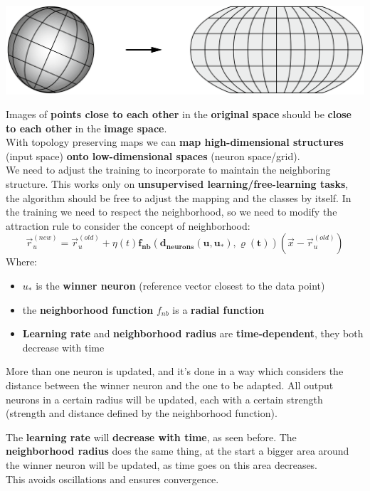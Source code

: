 \begin{center}
	\includegraphics[width=0.9\columnwidth]{img/NN/topology1}
\end{center}

Images of \textbf{points close to each other} in the \textbf{original space} should be \textbf{close to each other} in the \textbf{image space}.\\

With topology preserving maps we can \textbf{map high-dimensional structures} (input space) \textbf{onto low-dimensional spaces} (neuron space/grid).\\

We need to adjust the training to incorporate to maintain the neighboring structure. This works only on \textbf{unsupervised learning/free-learning tasks}, the algorithm should be free to adjust the mapping and the classes by itself. In the training we need to respect the neighborhood, so we need to modify the attraction rule to consider the concept of neighborhood:
$$ \vec{r}_u^{(new)} = \vec{r}_u^{(old)} + \eta(t) \bm{f_{nb} \left(d_{neurons} (u, u_{\ast}), \varrho (t)\right)} (\vec{x} - \vec{r}_u^{(old)}) $$
Where: 
\begin{itemize}
	\item $u_\ast$ is the \textbf{winner neuron} (reference vector closest to the data point)
	\item the \textbf{neighborhood function} $f_{nb}$ is a \textbf{radial function}
	\item \textbf{Learning rate} and \textbf{neighborhood radius} are \textbf{time-dependent}, they both decrease with time
\end{itemize}
More than one neuron is updated, and it's done in a way which considers the distance between the winner neuron and the one to be adapted. All output neurons in a certain radius will be updated, each with a certain strength (strength and distance defined by the neighborhood function).\\

\newpage

The \textbf{learning rate} will \textbf{decrease with time}, as seen before. The \textbf{neighborhood radius} does the same thing, at the start a bigger area around the winner neuron will be updated, as time goes on this area decreases.\\
This avoids oscillations and ensures convergence.\\

